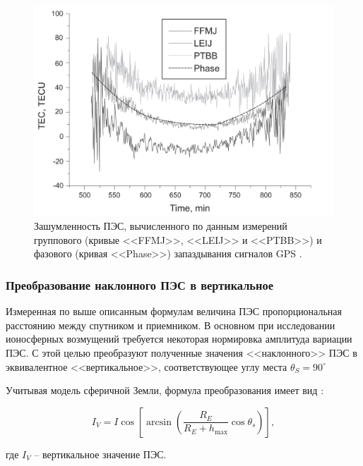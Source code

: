 \documentclass[14pt]{article}
\begin{document}
\begin{figure}[!h]
\centering
\includegraphics[width = \linewidth]{pics/pic2.png}
\caption{Зашумленность ПЭС, вычисленного по данным измерений группового (кривые <<FFMJ>>, <<LEIJ>> и <<PTBB>>) и фазового (кривая <<Phase>>) запаздывания сигналов GPS \cite{kozharin}.}
\label{pic2}
\end{figure}

\subsubsection{Преобразование наклонного ПЭС  в вертикальное}
Измеренная по выше описанным формулам величина ПЭС пропорциональная расстоянию между спутником и приемником. В основном при исследовании ионосферных возмущений требуется некоторая нормировка амплитуда вариации ПЭС. С этой целью преобразуют полученные значения <<наклонного>> ПЭС в эквивалентное <<вертикальное>>, соответствующее углу места $\theta_S = 90^{\circ}$ 

Учитывая модель сферичной Земли, формула преобразования имеет вид \cite{klobuchar}:

\begin{equation}
I_V = I \cos{\left[ \arcsin{\left( \frac{R_E}{R_E + h_\text{max}} \cos{\theta_s}\right)} \right]},
\end{equation} 

где $I_V$ -- вертикальное значение ПЭС. 

\newpage
\printbibliography
\end{document}
